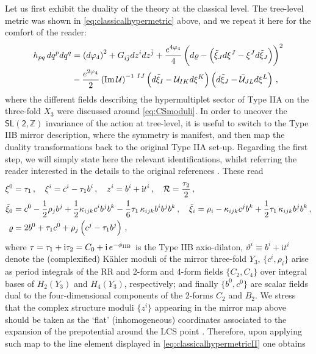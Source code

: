 Let us first exhibit the duality of the theory at the classical level. The tree-level metric was shown in \eqref{eq:classicalhypermetric} above, and we repeat it here for the comfort of the reader:
%
\begin{align}\label{eq:classicalhypermetricII}
	h_{p q}\, d q^p d q^q &= \left( d \varphi_4\right)^2 + G_{i \bar j} d z^i d z^{\bar j} + \frac{e^{4\varphi_4}}{4} \left( d \varrho - \left( \tilde{\xi}_J d\xi^J-\xi^J d\tilde{\xi}_J \right)\right)^2 \notag\\
	& -\frac{e^{2\varphi_4}}{2} \left( \text{Im}\, \mathcal{U}\right)^{-1\ IJ} \left( d\tilde{\xi}_I -\mathcal{U}_{IK} d\xi^K\right) \left( d\tilde{\xi}_J -\bar{\mathcal{U}}_{JL} d\xi^L\right)\, ,
\end{align}
%
where the different fields describing the hypermultiplet sector of Type IIA on the three-fold $X_3$ were discussed around \eqref{eq:CSmoduli}. In order to uncover the $\mathsf{SL(2,\mathbb{Z})}$ invariance of the action at tree-level, it is useful to switch to the Type IIB mirror description, where the symmetry is manifest, and then map the duality transformations back to the original Type IIA set-up. Regarding the first step,  we will simply state here the relevant identifications, whilst referring the reader interested in the details to the original references \cite{Candelas:1990rm, Aspinwall:1993nu}. These read 
%
\begin{align}\label{eq:mirrormap}
	\xi^0 &= \tau_1\, , \quad \xi^i = c^i-\tau_1 b^i\, , \quad z^i=b^i+\text{i}t^i\, , \quad \mathcal{R}=\frac{\tau_2}{2}\, , \notag\\
	\tilde{\xi}_0 &= c^0-\frac{1}{2} \rho_j b^j + \frac{1}{2} \kappa_{ijk} c^i b^j b^k - \frac{1}{6} \tau_1\, \kappa_{ijk} b^i b^j b^k\, , \quad \tilde{\xi}_i=\rho_i - \kappa_{ijk} c^j b^k + \frac{1}{2} \tau_1\, \kappa_{ijk} b^j b^k\, , \notag\\
	\varrho &= 2b^0 + \tau_1 c^0 + \rho_j \left( c^j - \tau_1 b^j\right)\, ,
\end{align}
%
where $\tau=\tau_1 + \text{i} \tau_2= C_0 + \text{i}\, e^{-\phi_{\rm{IIB}}}$ is the Type IIB axio-dilaton, $\vartheta^i \equiv b^i+ \text{i} t^i$ denote the (complexified) K\"ahler moduli of the mirror three-fold $Y_3$, $\{ c^i, \rho_i\}$ arise as period integrals of the RR and 2-form and 4-form fields $\{C_2, C_4\}$ over integral bases of $H_2(Y_3)$ and $H_4(Y_3)$, respectively; and finally $\{b^0, c^0 \}$ are scalar fields dual to the four-dimensional components of the 2-forms $C_2$ and $B_2$. We stress that the complex structure moduli $\{z^i\}$ appearing in the mirror map above should be taken as the `flat' (inhomogeneous)  coordinates associated to the expansion of the prepotential around the LCS point \cite{Hori:2003ic}. Therefore, upon applying such map to the line element displayed in \eqref{eq:classicalhypermetricII} one obtains \cite{Ferrara:1989ik}
